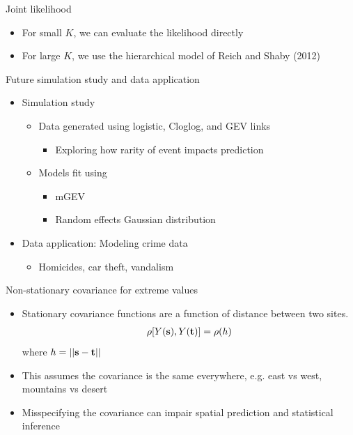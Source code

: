 \documentclass{beamer}
\begin{document}
\begin{frame}{Joint likelihood}
  \begin{itemize} \setlength{\itemsep}{1em}
    \item For small $K$, we can evaluate the likelihood directly
    \item For large $K$, we use the hierarchical model of Reich and Shaby (2012)
  \end{itemize}
\end{frame}

\begin{frame}{Future simulation study and data application}
  \begin{itemize} \setlength{\itemsep}{1em}
    \item Simulation study
    \begin{itemize}
      \item Data generated using logistic, Cloglog, and GEV links
      \begin{itemize}
        \item Exploring how rarity of event impacts prediction
      \end{itemize}
      \item Models fit using
      \begin{itemize}
        \item mGEV
        \item Random effects Gaussian distribution
      \end{itemize}
    \end{itemize}
    \item Data application: Modeling crime data
    \begin{itemize}
      \item Homicides, car theft, vandalism
    \end{itemize}
  \end{itemize}
\end{frame}


\begin{frame}{Non-stationary covariance for extreme values}
  \begin{itemize} \setlength{\itemsep}{1em}
    \item Stationary covariance functions are a function of distance between two sites.
    \begin{align*}
      \rho[Y(\mbox{\bf s}), Y(\mbox{\bf t})] = \rho(h)
    \end{align*}
    where $h = ||\mbox{\bf s} - \mbox{\bf t}||$
    \item This assumes the covariance is the same everywhere, e.g. east vs west, mountains vs desert
    \item Misspecifying the covariance can impair spatial prediction and statistical inference
  \end{itemize}
\end{frame}
\end{document}
